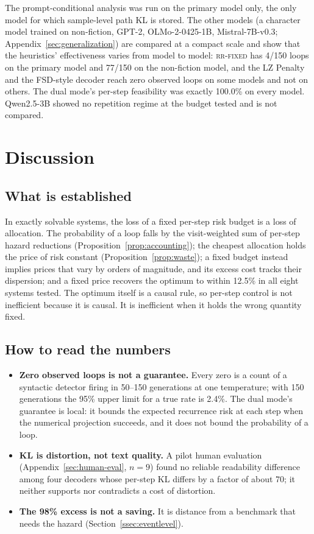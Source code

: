 \documentclass[make,article,submit,pdftex]{Definitions/mdpi}
\begin{document}
The prompt-conditional analysis was run on the primary model only, the only model for which sample-level path KL is stored. The other models (a character model trained on non-fiction, GPT-2, OLMo-2-0425-1B, Mistral-7B-v0.3; Appendix~\ref{sec:generalization}) are compared at a compact scale and show that the heuristics' effectiveness varies from model to model: \textsc{rr-fixed} has 4/150 loops on the primary model and 77/150 on the non-fiction model, and the LZ Penalty and the FSD-style decoder reach zero observed loops on some models and not on others. The dual mode's per-step feasibility was exactly 100.0\% on every model. Qwen2.5-3B showed no repetition regime at the budget tested and is not compared.

\section{Discussion}\label{sec:discussion}

\subsection{What is established}
In exactly solvable systems, the loss of a fixed per-step risk budget is a loss of allocation. The probability of a loop falls by the visit-weighted sum of per-step hazard reductions (Proposition~\ref{prop:accounting}); the cheapest allocation holds the price of risk constant (Proposition~\ref{prop:waste}); a fixed budget instead implies prices that vary by orders of magnitude, and its excess cost tracks their dispersion; and a fixed price recovers the optimum to within 12.5\% in all eight systems tested. The optimum itself is a causal rule, so per-step control is not inefficient because it is causal. It is inefficient when it holds the wrong quantity fixed.

\subsection{How to read the numbers}
\begin{itemize}[leftmargin=*,itemsep=2pt]
\item \textbf{Zero observed loops is not a guarantee.} Every zero is a count of a syntactic detector firing in 50--150 generations at one temperature; with 150 generations the 95\% upper limit for a true rate is 2.4\%. The dual mode's guarantee is local: it bounds the expected recurrence risk at each step when the numerical projection succeeds, and it does not bound the probability of a loop.
\item \textbf{KL is distortion, not text quality.} A pilot human evaluation (Appendix~\ref{sec:human-eval}, $n=9$) found no reliable readability difference among four decoders whose per-step KL differs by a factor of about 70; it neither supports nor contradicts a cost of distortion.
\item \textbf{The 98\% excess is not a saving.} It is distance from a benchmark that needs the hazard (Section~\ref{ssec:eventlevel}).
\end{itemize}
\end{document}
